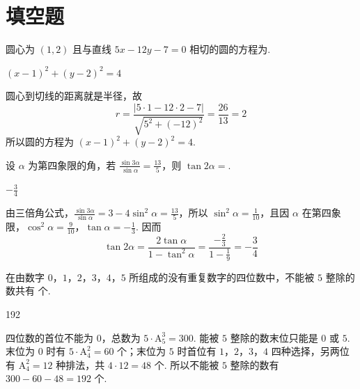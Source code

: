 \section{填空题}
\begin{problem}
圆心为 \((1,2)\) 且与直线 \( 5x - 12y - 7 = 0 \) 相切的圆的方程为\fillinblank{}.
\end{problem}

\begin{answer}
\((x-1)^2+(y-2)^2=4\)
\end{answer}

\begin{solution}
圆心到切线的距离就是半径，故
\[
r=\frac{|5\cdot1-12\cdot2-7|}{\sqrt{5^2+(-12)^2}}=\frac{26}{13}=2
\]
所以圆的方程为 \((x-1)^2+(y-2)^2=4\).
\end{solution}

\begin{problem}
设 \(\alpha\) 为第四象限的角，若 \(\frac{\sin 3\alpha}{\sin \alpha} = \frac{13}{5}\)，则 \(\tan 2\alpha =\)\fillinblank{}.
\end{problem}

\begin{answer}
\(-\frac{3}{4}\)
\end{answer}

\begin{solution}
由三倍角公式，\(\frac{\sin3\alpha}{\sin\alpha}=3-4\sin^2\alpha=\frac{13}{5}\)，所以 \(\sin^2\alpha=\frac{1}{10}\)，且因 \(\alpha\) 在第四象限，\(\cos^2\alpha=\frac{9}{10}\)，\(\tan\alpha=-\frac{1}{3}\). 因而
\[
\tan2\alpha=\frac{2\tan\alpha}{1-\tan^2\alpha}=\frac{-\frac{2}{3}}{1-\frac{1}{9}}=-\frac{3}{4}
\]
\end{solution}

\begin{problem}
在由数字 \(0\)，\(1\)，\(2\)，\(3\)，\(4\)，\(5\) 所组成的没有重复数字的四位数中，不能被 \(5\) 整除的数共有\fillinblank{} 个.
\end{problem}

\begin{answer}
192
\end{answer}

\begin{solution}
四位数的首位不能为 \(0\)，总数为 \(5\cdot\mathrm A_{5}^{3}=300\). 能被 \(5\) 整除的数末位只能是 \(0\) 或 \(5\). 末位为 \(0\) 时有 \(5\cdot\mathrm A_{4}^{2}=60\) 个；末位为 \(5\) 时首位有 \(1\)，\(2\)，\(3\)，\(4\) 四种选择，另两位有 \(\mathrm A_{4}^{2}=12\) 种排法，共 \(4\cdot12=48\) 个. 所以不能被 \(5\) 整除的数有 \(300-60-48=192\) 个.
\end{solution}

